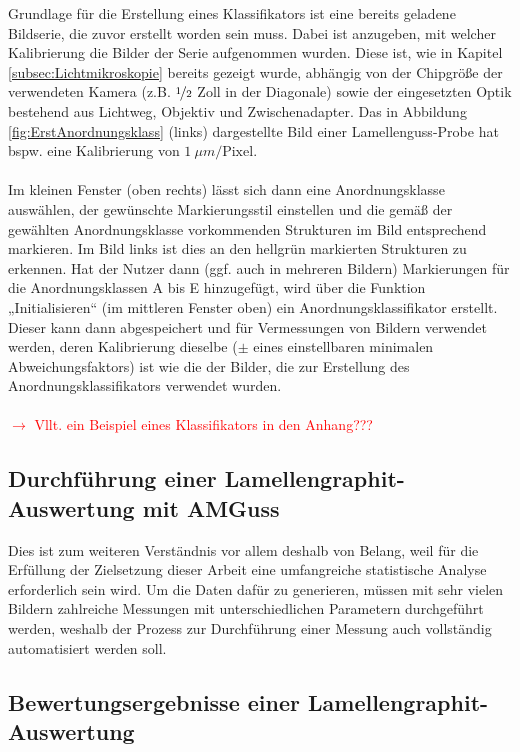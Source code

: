 \documentclass[
fontsize=10pt, 
listof = totoc,
parskip = half	
]{report}
\begin{document}
\noindent Grundlage für die Erstellung eines Klassifikators ist eine bereits geladene Bildserie, die zuvor erstellt worden sein muss. Dabei ist anzugeben, mit welcher Kalibrierung  die Bilder der Serie aufgenommen wurden. Diese ist, wie in Kapitel \ref{subsec:Lichtmikroskopie} bereits gezeigt wurde,  abhängig von der Chipgröße der verwendeten Kamera (z.B. $\nicefrac{1}{2}$ Zoll in der Diagonale)  sowie der eingesetzten Optik bestehend aus Lichtweg, Objektiv und Zwischenadapter. Das in Abbildung \ref{fig:ErstAnordnungsklass} (links) dargestellte Bild einer Lamellenguss-Probe hat bspw. eine Kalibrierung von $1~\mu m/\text{Pixel}$. 
\\\\
Im kleinen Fenster (oben rechts) lässt sich dann eine Anordnungsklasse auswählen, der gewünschte Markierungsstil einstellen und die gemäß der gewählten Anordnungsklasse vorkommenden Strukturen im Bild entsprechend markieren. Im Bild links ist dies an den hellgrün markierten Strukturen zu erkennen. Hat der Nutzer dann (ggf. auch in mehreren Bildern) Markierungen für die Anordnungsklassen A bis E hinzugefügt, wird über die Funktion „Initialisieren“ (im mittleren Fenster oben) ein Anordnungsklassifikator erstellt. Dieser kann dann abgespeichert und für Vermessungen von Bildern verwendet werden, deren Kalibrierung dieselbe ($\pm$ eines einstellbaren minimalen Abweichungsfaktors) ist wie die der Bilder, die zur Erstellung des Anordnungsklassifikators verwendet wurden. 
\\\\
\textcolor{red}{$\to$ Vllt. ein Beispiel eines Klassifikators in den Anhang???}

\subsection{Durchführung einer Lamellengraphit-Auswertung mit AMGuss}
\label{subsec:LamelloGraphMesssung}
Dies ist zum weiteren Verständnis vor allem deshalb von Belang, weil für die Erfüllung der Zielsetzung dieser Arbeit eine umfangreiche statistische Analyse erforderlich sein wird. Um die Daten dafür zu generieren, müssen mit sehr vielen Bildern zahlreiche Messungen  mit unterschiedlichen Parametern durchgeführt werden, weshalb der Prozess zur Durchführung einer Messung auch vollständig automatisiert werden soll.

\subsection{Bewertungsergebnisse einer Lamellengraphit-Auswertung}
\label{subsec:ErgebnisseAMGuss}
\end{document}
